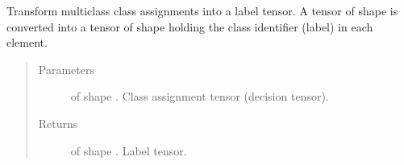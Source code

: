 \documentclass[letterpaper,10pt,english]{sphinxmanual}
\begin{document}
\begin{fulllineitems}
\label{\detokenize{pusion.util.transformer:pusion.util.transformer.class_assignment_tensor_to_label_tensor}}
\sphinxAtStartPar
Transform multiclass class assignments into a label tensor. A tensor of shape
 is converted into a tensor of shape  holding the
class identifier (label) in each element.
\begin{quote}\begin{description}
\item[{Parameters}] \leavevmode
\sphinxAtStartPar
{} \textendash{}  of shape .
Class assignment tensor (decision tensor).

\item[{Returns}] \leavevmode
\sphinxAtStartPar
{} of shape . Label tensor.

\end{description}\end{quote}

\end{fulllineitems}

\end{document}
